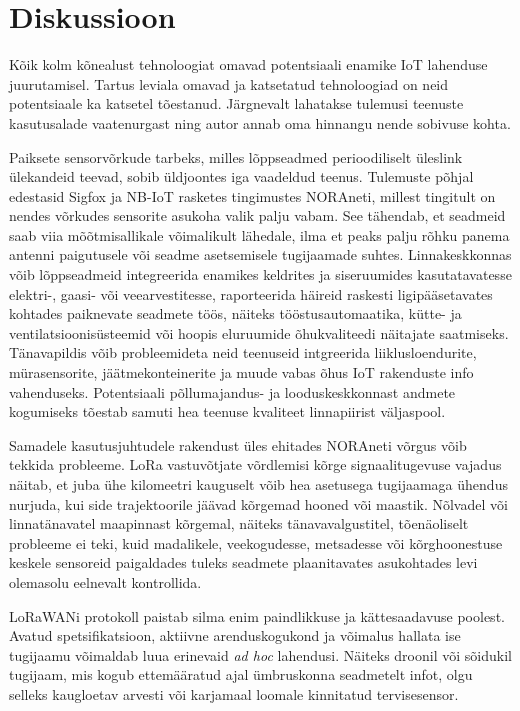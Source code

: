 \documentclass[12pt]{article}
\begin{document}
    \newpage

    \section{Diskussioon}

    Kõik kolm kõnealust tehnoloogiat omavad potentsiaali enamike IoT lahenduse juurutamisel.
    Tartus leviala omavad ja katsetatud tehnoloogiad on neid potentsiaale ka katsetel tõestanud.
    Järgnevalt lahatakse tulemusi teenuste kasutusalade vaatenurgast ning autor annab oma hinnangu nende sobivuse kohta.

    Paiksete sensorvõrkude tarbeks, milles lõppseadmed perioodiliselt üleslink ülekandeid teevad, sobib üldjoontes iga vaadeldud teenus.
    Tulemuste põhjal edestasid Sigfox ja NB-IoT rasketes tingimustes NORAneti, millest tingitult on nendes võrkudes sensorite asukoha valik palju vabam.
    See tähendab, et seadmeid saab viia mõõtmisallikale võimalikult lähedale, ilma et peaks palju rõhku panema antenni paigutusele või seadme asetsemisele tugijaamade suhtes.
    Linnakeskkonnas võib lõppseadmeid integreerida enamikes keldrites ja siseruumides kasutatavatesse elektri-, gaasi- või veearvestitesse, raporteerida häireid raskesti ligipääsetavates kohtades paiknevate seadmete töös, näiteks tööstusautomaatika, kütte- ja ventilatsioonisüsteemid või hoopis eluruumide õhukvaliteedi näitajate saatmiseks.
    Tänavapildis võib probleemideta neid teenuseid intgreerida liiklusloendurite, mürasensorite, jäätmekonteinerite ja muude vabas õhus IoT rakenduste info vahenduseks.
    Potentsiaali põllumajandus- ja looduskeskkonnast andmete kogumiseks tõestab samuti hea teenuse kvaliteet linnapiirist väljaspool.

    Samadele kasutusjuhtudele rakendust üles ehitades NORAneti võrgus võib tekkida probleeme.
    LoRa vastuvõtjate võrdlemisi kõrge signaalitugevuse vajadus näitab, et juba ühe kilomeetri kauguselt võib hea asetusega tugijaamaga ühendus nurjuda, kui side trajektoorile jäävad kõrgemad hooned või maastik.
    Nõlvadel või linnatänavatel maapinnast kõrgemal, näiteks tänavavalgustitel, tõenäoliselt probleeme ei teki, kuid madalikele, veekogudesse, metsadesse või kõrghoonestuse keskele sensoreid paigaldades tuleks seadmete plaanitavates asukohtades levi olemasolu eelnevalt kontrollida.

    LoRaWANi protokoll paistab silma enim paindlikkuse ja kättesaadavuse poolest.
    Avatud spetsifikatsioon, aktiivne arenduskogukond ja võimalus hallata ise tugijaamu võimaldab luua erinevaid \textit{ad hoc} lahendusi.
    Näiteks droonil või sõidukil tugijaam, mis kogub ettemääratud ajal ümbruskonna seadmetelt infot, olgu selleks kaugloetav arvesti või karjamaal loomale kinnitatud tervisesensor.
\end{document}
